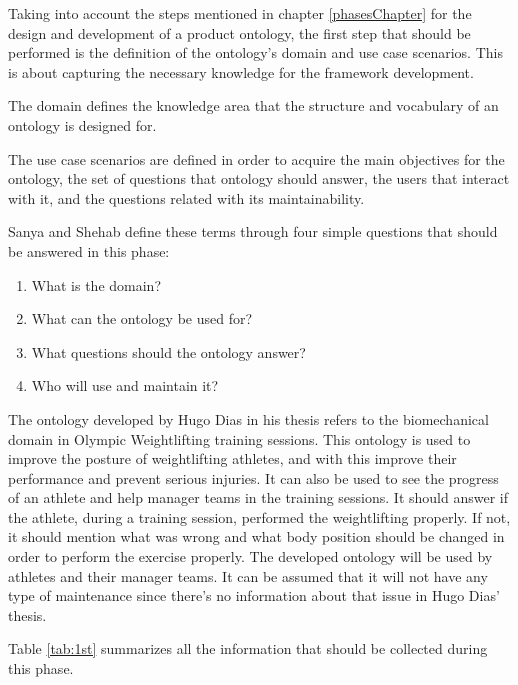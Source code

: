 Taking into account the steps mentioned in chapter \ref{phasesChapter} for the design and development of a product ontology, the first step that should be performed is the definition of the ontology's domain and use case scenarios. This is about capturing the necessary knowledge for the framework development.
\par The domain defines the knowledge area that the structure and vocabulary of an ontology is designed for.
\par The use case scenarios are defined in order to acquire the main objectives for the ontology, the set of questions that ontology should answer, the users that interact with it, and the questions related with its maintainability.
\par Sanya and Shehab \cite{AeroArticle} define these terms through four simple questions that should be answered in this phase:
\begin{enumerate}
\item What is the domain?
\item What can the ontology be used for?
\item What questions should the ontology answer?
\item Who will use and maintain it?
\end{enumerate}

\par The ontology developed by Hugo Dias \cite{HugoThesis} in his thesis refers to the biomechanical domain in Olympic Weightlifting training sessions.
This ontology is used to improve the posture of weightlifting athletes, and with this improve their performance and prevent serious injuries. It can also be used to see the progress of an athlete and help manager teams in the training sessions.
It should answer if the athlete, during a training session, performed the weightlifting properly. If not, it should mention what was wrong and what body position should be changed in order to perform the exercise properly.
The developed ontology will be used by athletes and their manager teams. It can be assumed that it will not have any type of maintenance since there's no information about that issue in Hugo Dias' \cite{HugoThesis} thesis. 
\par Table \ref{tab:1st} summarizes all the information that should be collected during this phase. 

